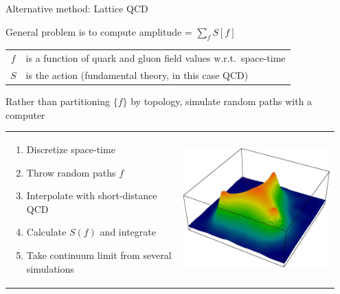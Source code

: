 \documentclass[landscape]{article}
\begin{document}
\begin{slide:intro}

Alternative method: Lattice QCD

\vfill
General problem is to compute amplitude = $\displaystyle \sum_f S[f]$
\begin{center}
\begin{tabular}{c l}
  $f$ & is a function of quark and gluon field values w.r.t.\ space-time \\
  $S$ & is the action (fundamental theory, in this case QCD)
\end{tabular}
\end{center}

\vfill
Rather than partitioning $\{f\}$ by topology, simulate random paths with a computer

\vfill
\begin{center}
\begin{tabular}{p{0.5\linewidth} p{0.45\linewidth}}
\begin{minipage}{\linewidth}
\begin{enumerate}\setlength{\itemsep}{0.75 cm}

  \item Discretize space-time

  \item Throw random paths $f$

  \item Interpolate with short-distance QCD

  \item Calculate $S(f)$ and integrate

  \item Take continuum limit from several simulations

\end{enumerate}
\end{minipage} &
\begin{minipage}{\linewidth}
\includegraphics[width=\linewidth]{plots/qcd_proton}
\end{minipage}
\end{tabular}
\end{center}

\end{slide:intro}
\end{document}
